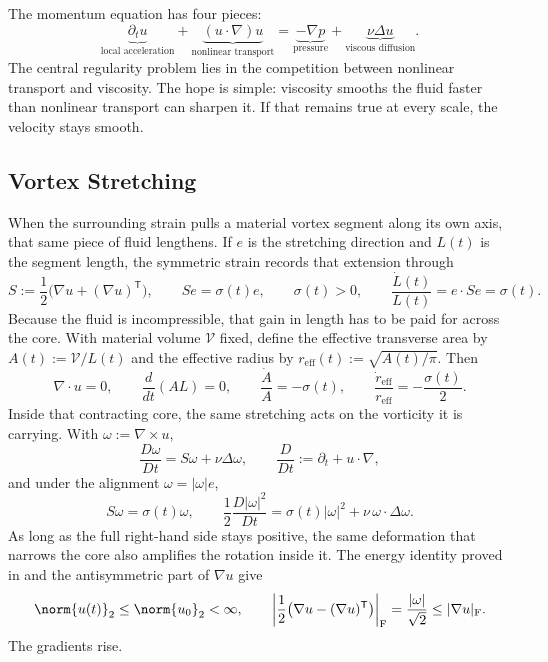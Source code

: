 
The momentum equation has four pieces:
\[
  \underbrace{\partial_t u}_{\text{local acceleration}}
  +
  \underbrace{(u\cdot\nabla)u}_{\text{nonlinear transport}}
  =
  \underbrace{-\nabla p}_{\text{pressure}}
  +
  \underbrace{\nu\Delta u}_{\text{viscous diffusion}}.
\]
The central regularity problem lies in the competition between nonlinear transport and viscosity.
The hope is simple: viscosity smooths the fluid faster than nonlinear transport can sharpen it.
If that remains true at every scale, the velocity stays smooth.

\subsection{Vortex Stretching}\label{sub:ThePerfectlyStretchingVortex}

When the surrounding strain pulls a material vortex segment along its own axis, that same piece of fluid lengthens. If \(e\) is the stretching direction and \(L(t)\) is the segment length, the symmetric strain records that extension through
\[
  S:=\frac12\bigl(\nabla u+(\nabla u)^{\mathsf T}\bigr),
  \qquad
  Se=\sigma(t)e,
  \qquad
  \sigma(t)>0,
  \qquad
  \frac{\dot L(t)}{L(t)}
  =
  e\cdot Se
  =
  \sigma(t).
\]
Because the fluid is incompressible, that gain in length has to be paid for across the core. With material volume \(\mathcal V\) fixed, define the effective transverse area by \(A(t):=\mathcal V/L(t)\) and the effective radius by \(r_{\mathrm{eff}}(t):=\sqrt{A(t)/\pi}\). Then
\[
  \nabla\cdot u=0,
  \qquad
  \frac{d}{dt}(A L)=0,
  \qquad
  \frac{\dot A}{A}=-\sigma(t),
  \qquad
  \frac{\dot r_{\mathrm{eff}}}{r_{\mathrm{eff}}}
  =
  -\frac{\sigma(t)}{2}.
\]
Inside that contracting core, the same stretching acts on the vorticity it is carrying. With \(\omega:=\nabla\times u\),
\[
  \frac{D\omega}{Dt}
  =
  S\omega+\nu\Delta\omega,
  \qquad
  \frac{D}{Dt}
  :=
  \partial_t+u\cdot\nabla,
\]
and under the alignment \(\omega=|\omega|e\),
\[
  S\omega
  =
  \sigma(t)\omega,
  \qquad
  \frac12\frac{D|\omega|^2}{Dt}
  =
  \sigma(t)|\omega|^2
  +
  \nu\,\omega\cdot\Delta\omega.
\]
As long as the full right-hand side stays positive, the same deformation that narrows the core also amplifies the rotation inside it. The energy identity proved in  and the antisymmetric part of \(\nabla u\) give
\[
  \norm{u(t)}_2
  \leq
  \norm{u_0}_2
  <\infty,
  \qquad
  \left|\frac12\bigl(\nabla u-(\nabla u)^{\mathsf T}\bigr)\right|_{\mathrm F}
  =
  \frac{|\omega|}{\sqrt2}
  \leq
  |\nabla u|_{\mathrm F}.
\]
The gradients rise.


